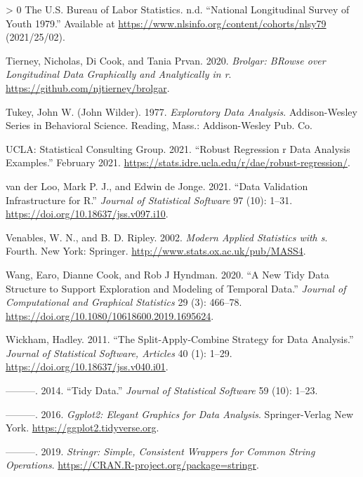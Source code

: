\documentclass{article}
\newlength{\cslhangindent}
\newenvironment{CSLReferences}[3] %
 {%
  \setlength{\parindent}{0pt}
  \ifodd #1 \everypar{\setlength{\hangindent}{\cslhangindent}}\ignorespaces\fi
  \ifnum #2 > 0
  \setlength{\parskip}{#2\baselineskip}
  \fi
 }%
 {}
\begin{document}
\begin{CSLReferences}{1}{0}
\leavevmode\hypertarget{ref-nlsy79}{}%
The U.S. Bureau of Labor Statistics. n.d. {``National Longitudinal Survey of Youth 1979.''} Available at \url{https://www.nlsinfo.org/content/cohorts/nlsy79} (2021/25/02).

\leavevmode\hypertarget{ref-brolgar}{}%
Tierney, Nicholas, Di Cook, and Tania Prvan. 2020. \emph{Brolgar: BRowse over Longitudinal Data Graphically and Analytically in r}. \url{https://github.com/njtierney/brolgar}.

\leavevmode\hypertarget{ref-tukey}{}%
Tukey, John W. (John Wilder). 1977. \emph{Exploratory Data Analysis}. Addison-Wesley Series in Behavioral Science. Reading, Mass.: Addison-Wesley Pub. Co.

\leavevmode\hypertarget{ref-rlm}{}%
UCLA: Statistical Consulting Group. 2021. {``Robust Regression \textbar{} r Data Analysis Examples.''} February 2021. \url{https://stats.idre.ucla.edu/r/dae/robust-regression/}.

\leavevmode\hypertarget{ref-validate}{}%
van der Loo, Mark P. J., and Edwin de Jonge. 2021. {``Data Validation Infrastructure for {R}.''} \emph{Journal of Statistical Software} 97 (10): 1--31. \url{https://doi.org/10.18637/jss.v097.i10}.

\leavevmode\hypertarget{ref-mass}{}%
Venables, W. N., and B. D. Ripley. 2002. \emph{Modern Applied Statistics with s}. Fourth. New York: Springer. \url{http://www.stats.ox.ac.uk/pub/MASS4}.

\leavevmode\hypertarget{ref-tsibble}{}%
Wang, Earo, Dianne Cook, and Rob J Hyndman. 2020. {``A New Tidy Data Structure to Support Exploration and Modeling of Temporal Data.''} \emph{Journal of Computational and Graphical Statistics} 29 (3): 466--78. \url{https://doi.org/10.1080/10618600.2019.1695624}.

\leavevmode\hypertarget{ref-plyr}{}%
Wickham, Hadley. 2011. {``The Split-Apply-Combine Strategy for Data Analysis.''} \emph{Journal of Statistical Software, Articles} 40 (1): 1--29. \url{https://doi.org/10.18637/jss.v040.i01}.

\leavevmode\hypertarget{ref-WickhamHadley2014TD}{}%
---------. 2014. {``Tidy Data.''} \emph{Journal of Statistical Software} 59 (10): 1--23.

\leavevmode\hypertarget{ref-ggplot2}{}%
---------. 2016. \emph{Ggplot2: Elegant Graphics for Data Analysis}. Springer-Verlag New York. \url{https://ggplot2.tidyverse.org}.

\leavevmode\hypertarget{ref-stringr}{}%
---------. 2019. \emph{Stringr: Simple, Consistent Wrappers for Common String Operations}. \url{https://CRAN.R-project.org/package=stringr}.


\end{CSLReferences}
\end{document}
